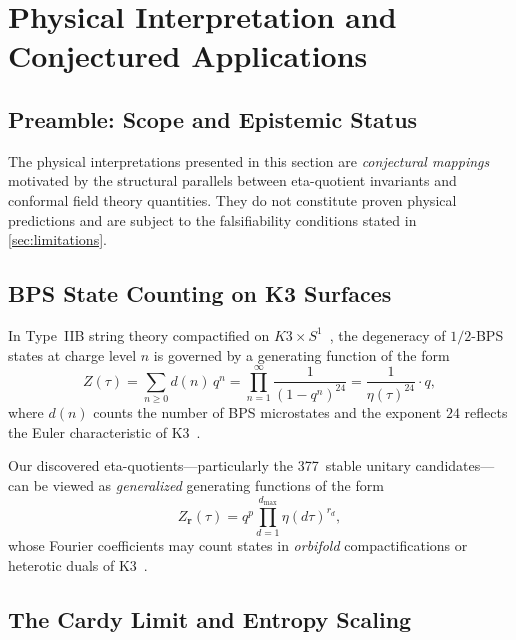 \section{Physical Interpretation and Conjectured Applications}
\label{sec:physics}

\subsection{Preamble: Scope and Epistemic Status}

The physical interpretations presented in this section are
\emph{conjectural mappings} motivated by the structural
parallels between eta-quotient invariants and conformal
field theory quantities.  They do not constitute proven
physical predictions and are subject to the falsifiability
conditions stated in \cref{sec:limitations}.

\subsection{BPS State Counting on K3 Surfaces}

In Type~IIB string theory compactified on
$K3 \times S^1$~\cite{strominger_vafa_1996}, the
degeneracy of $1/2$-BPS states at charge level $n$ is
governed by a generating function of the form
\begin{equation}
  Z(\tau) = \sum_{n \geq 0} d(n) \, q^n
  = \prod_{n=1}^{\infty} \frac{1}{(1-q^n)^{24}}
  = \frac{1}{\eta(\tau)^{24}} \cdot q,
\end{equation}
where $d(n)$ counts the number of BPS microstates and
the exponent $24$ reflects the Euler characteristic of
K3~\cite{dijkgraaf_verlinde_verlinde}.

Our discovered eta-quotients---particularly the 377~stable
unitary candidates---can be viewed as \emph{generalized}
generating functions of the form
\begin{equation}
  Z_{\mathbf{r}}(\tau) = q^{p}
  \prod_{d=1}^{d_{\max}} \eta(d\tau)^{r_d},
\end{equation}
whose Fourier coefficients may count states in
\emph{orbifold} compactifications or heterotic duals
of K3~\cite{dabholkar_2005}.

\subsection{The Cardy Limit and Entropy Scaling}

